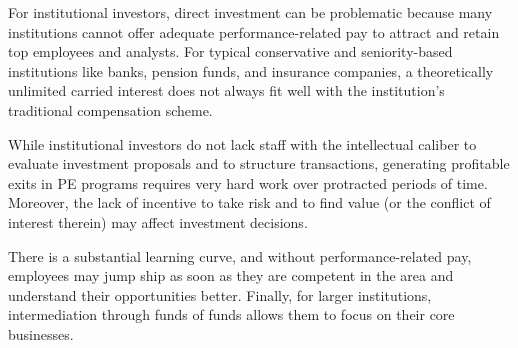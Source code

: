\documentclass[11pt]{article}
\begin{document}
For institutional investors, direct investment can be problematic because many institutions cannot offer adequate performance-related pay to attract and retain top employees and analysts. For typical conservative and seniority-based institutions like banks, pension funds, and insurance companies, a theoretically unlimited carried interest does not always fit well with the institution's traditional compensation scheme.

While institutional investors do not lack staff with the intellectual caliber to evaluate investment proposals and to structure transactions, generating profitable exits in PE programs requires very hard work over protracted periods of time. Moreover, the lack of incentive to take risk and to find value (or the conflict of interest therein) may affect investment decisions.

There is a substantial learning curve, and without performance-related pay, employees may jump ship as soon as they are competent in the area and understand their opportunities better. Finally, for larger institutions, intermediation through funds of funds allows them to focus on their core businesses.
\end{document}

